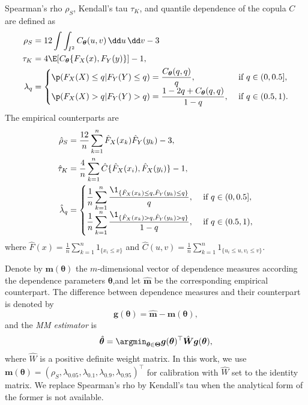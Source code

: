 Spearman's rho $\rho_S$, Kendall's tau $\tau_K$, and quantile dependence of the copula $C$ are defined as
\begin{align*}
  \rho_S &= 12 \int\int_{I^2} C_{\bm{\theta}}(u,v)\, \dd u\, \dd v-3\label{eq:rho_S}\\
  \tau_K &= 4\E[C_{\bm{\theta}}\{F_X(x), F_Y(y)\}]-1,\\
  \lambda_q &=
  \begin{cases}
    \p(F_X(X)\leq q| F_Y(Y)\leq q) = \displaystyle \frac{C_{\bm{\theta}}(q,q)}{q},
    &\text{ if } q\in (0,0.5],\\
    \p(F_X(X)>q|F_Y(Y)>q) =\displaystyle \frac{1-2q+C_{\bm{\theta}}(q,q)} {1-q},
    &\text{ if } q\in (0.5,1).
  \end{cases}
\end{align*}
The empirical counterparts are
\begin{align*}
  \hat\rho_S &= \frac{12}{n} \sum_{k=1}^n \hat F_X(x_k) \hat F_Y(y_k)
               -3,\\
  \hat\tau_K &= \frac{4}{n}\sum_{k=1}^n \hat{C}\{\hat{F}_X(x_i),\hat{F}_X(y_i)\} -1 ,\\
  \hat\lambda_q &=
                  \begin{cases}
                    \displaystyle\frac{1}{n} \sum_{k=1}^n \frac{\1_{\{\hat
                        F_X(x_k)\leq q, \hat F_Y(y_k)\leq q\}}} {q},
                    &\text { if } q\in (0, 0.5],\\
                    \displaystyle \frac{1}{n} \sum_{k=1}^n
                    \frac{\1_{\{\hat F_X(x_k)>q, \hat F_Y(y_k)>q\}}}
                    {1-q}, &\text { if } q\in (0.5,1),
                  \end{cases}
\end{align*}
where $\displaystyle \hat{F}(x) =
  \frac{1}{n}\sum_{k=1}^n 1_{\{x_i\leq x\}}$ and
$\displaystyle \hat{C}(u,v) = \frac{1}{n}\sum_{k=1}^n 1_{\{u_i\leq u, v_i\leq v\}}$. 

Denote by $\bm{m}(\bm{\theta})$ the $m$-dimensional vector of
dependence measures according the dependence parameters
$\bm{\theta}$,and let $\hat{\bm{m}}$ be the corresponding empirical
counterpart. 
The difference between dependence measures and their counterpart is denoted by
\begin{equation*}
    \bm{g}(\bm{\theta}) = \hat{\bm{m}} - \bm{m}(\bm{\theta}),
\end{equation*}
and the {\em MM estimator} is
\begin{equation*}
    \hat{\bm{\theta}} = \argmin_{\bm{\theta}\in \bm{\Theta}} \bm{g}(\bm{\theta})^\top
    \hat{\bm{W}}
     \bm{g}(\bm{\theta}),
\end{equation*}
where $\hat{W}$ is a positive definite weight matrix.
In this work, we use
$\bm{m}(\bm{\theta}) = (\rho_S, \lambda_{0.05}, \lambda_{0.1}, 
\lambda_{0.9}, \lambda_{0.95})^\top$
for calibration with 
$\hat{W}$ set to the identity matrix. 
We replace Spearman's rho by Kendall's tau when the analytical form of the former is not available. 

